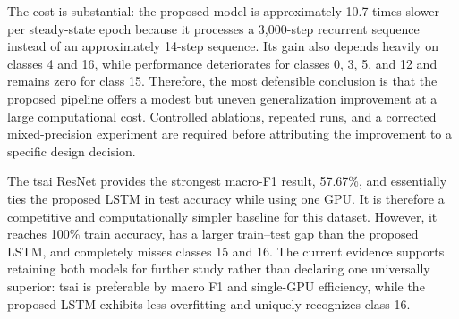 \documentclass[11pt,a4paper]{article}
\begin{document}
The cost is substantial: the proposed model is approximately 10.7 times
slower per steady-state epoch because it processes a 3,000-step recurrent
sequence instead of an approximately 14-step sequence. Its gain also depends
heavily on classes 4 and 16, while performance deteriorates for classes 0, 3,
5, and 12 and remains zero for class 15. Therefore, the most defensible
conclusion is that the proposed pipeline offers a modest but uneven
generalization improvement at a large computational cost. Controlled
ablations, repeated runs, and a corrected mixed-precision experiment are
required before attributing the improvement to a specific design decision.

The tsai ResNet provides the strongest macro-F1 result, 57.67\%, and essentially
ties the proposed LSTM in test accuracy while using one GPU. It is therefore a
competitive and computationally simpler baseline for this dataset. However,
it reaches 100\% train accuracy, has a larger train--test gap than the proposed
LSTM, and completely misses classes 15 and 16. The current evidence supports
retaining both models for further study rather than declaring one universally
superior: tsai is preferable by macro F1 and single-GPU efficiency, while the
proposed LSTM exhibits less overfitting and uniquely recognizes class 16.
\end{document}
